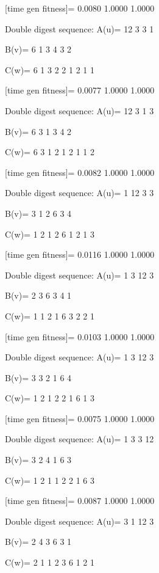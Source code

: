 [time gen fitness]=
    0.0080    1.0000    1.0000

Double digest sequence:
A(u)=
    12     3     3     1

B(v)=
     6     1     3     4     3     2

C(w)=
     6     1     3     2     2     1     2     1     1

[time gen fitness]=
    0.0077    1.0000    1.0000

Double digest sequence:
A(u)=
    12     3     1     3

B(v)=
     6     3     1     3     4     2

C(w)=
     6     3     1     2     1     2     1     1     2

[time gen fitness]=
    0.0082    1.0000    1.0000

Double digest sequence:
A(u)=
     1    12     3     3

B(v)=
     3     1     2     6     3     4

C(w)=
     1     2     1     2     6     1     2     1     3

[time gen fitness]=
    0.0116    1.0000    1.0000

Double digest sequence:
A(u)=
     1     3    12     3

B(v)=
     2     3     6     3     4     1

C(w)=
     1     1     2     1     6     3     2     2     1

[time gen fitness]=
    0.0103    1.0000    1.0000

Double digest sequence:
A(u)=
     1     3    12     3

B(v)=
     3     3     2     1     6     4

C(w)=
     1     2     1     2     2     1     6     1     3

[time gen fitness]=
    0.0075    1.0000    1.0000

Double digest sequence:
A(u)=
     1     3     3    12

B(v)=
     3     2     4     1     6     3

C(w)=
     1     2     1     1     2     2     1     6     3

[time gen fitness]=
    0.0087    1.0000    1.0000

Double digest sequence:
A(u)=
     3     1    12     3

B(v)=
     2     4     3     6     3     1

C(w)=
     2     1     1     2     3     6     1     2     1

